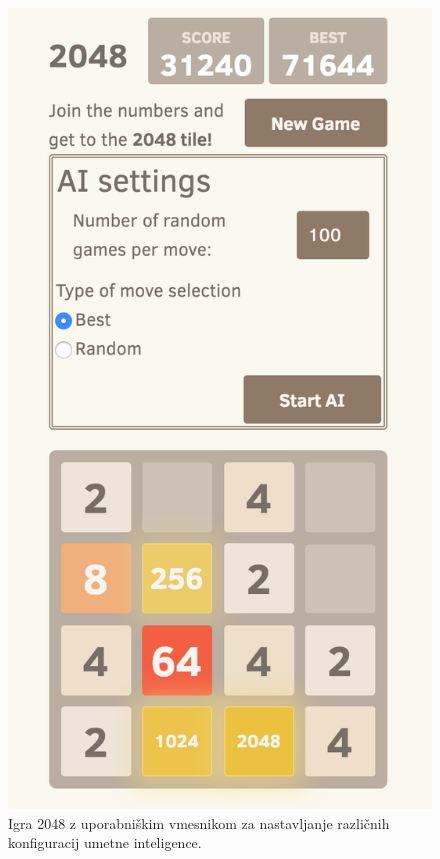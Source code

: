 \documentclass[a4paper,11pt]{article}
\begin{document}
\begin{figure}[h!]
\begin{center}
\includegraphics[scale=0.5]{igra.png}
\caption{Igra 2048 z uporabniškim vmesnikom za nastavljanje različnih konfiguracij umetne inteligence.}
\label{slika1}
\end{center}
\end{figure}
\end{document}
